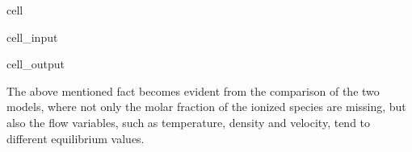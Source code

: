 \documentclass[letterpaper,10pt,english]{jupyterBook}
\begin{document}
\begin{sphinxuseclass}{cell}
\begin{sphinxVerbatimInput}
\begin{sphinxuseclass}{cell_input}
\begin{sphinxVerbatim}[commandchars=\\\{\}]
\end{sphinxVerbatim}

\end{sphinxuseclass}\end{sphinxVerbatimInput}
\begin{sphinxVerbatimOutput}

\begin{sphinxuseclass}{cell_output}
\noindent{}

\end{sphinxuseclass}\end{sphinxVerbatimOutput}

\end{sphinxuseclass}
\sphinxAtStartPar
The above mentioned fact becomes evident from the comparison of the two models, where not only the molar fraction of the ionized species are missing, but also the flow variables, such as temperature, density and velocity, tend to different equilibrium values.







\renewcommand{\indexname}{Index}
\printindex
\end{document}
